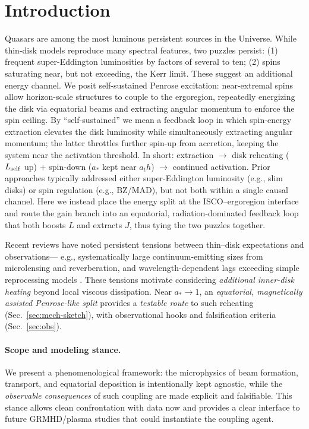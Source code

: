 \documentclass[twocolumn]{aastex701}
\newcommand{\ath}{a_{\rm th}}
\newcommand{\rg}{r_g}
\newcommand{\LEdd}{L_{\rm Edd}}
\newcommand{\Ltot}{L_{\rm tot}}
\newcommand{\FeKa}{\mathrm{Fe\,K}\alpha}
\def\ath{a_th}\def\rg{r_g}\def\LEdd{L_Edd}\def\Ltot{L_tot}\def\FeKa{Fe K\string\alpha}%
\begin{document}
\section{Introduction}\label{sec:intro}
Quasars are among the most luminous persistent sources in the Universe. While thin-disk models reproduce many spectral features, two puzzles persist: (1) frequent super-Eddington luminosities by factors of several to ten; (2) spins saturating near, but not exceeding, the Kerr limit. These suggest an additional energy channel. We posit self-sustained Penrose excitation: near-extremal spins allow horizon-scale structures to couple to the ergoregion, repeatedly energizing the disk via equatorial beams and extracting angular momentum to enforce the spin ceiling.
By ``self-sustained'' we mean a feedback loop in which spin-energy extraction elevates the disk luminosity while simultaneously extracting angular momentum; the latter throttles further spin-up from accretion, keeping the system near the activation threshold. In short: extraction $\rightarrow$ disk reheating ($L_{\rm self}$ up) $+$ spin-down ($a_\ast$ kept near $\ath$) $\rightarrow$ continued activation.
Prior approaches typically addressed either super-Eddington luminosity (e.g., slim disks) or spin regulation (e.g., BZ/MAD), but not both within a single causal channel. Here we instead place the energy split at the ISCO–ergoregion interface and route the gain branch into an equatorial, radiation-dominated feedback loop that both boosts $L$ and extracts $J$, thus tying the two puzzles together.

Recent reviews have noted persistent tensions between thin–disk expectations and observations—
e.g., systematically large continuum-emitting sizes from microlensing and reverberation, and
wavelength-dependent lags exceeding simple reprocessing models \citep[e.g.,][]{Cackett2021RevMap,Sun2020AGNsize}.
These tensions motivate considering \emph{additional inner-disk heating} beyond local viscous dissipation.
Near $a_*\!\to\!1$, an \emph{equatorial, magnetically assisted Penrose-like split} provides a \emph{testable route}
to such reheating (Sec.~\ref{sec:mech-sketch}), with observational hooks and falsification criteria
(Sec.~\ref{sec:obs}).


\paragraph{Scope and modeling stance.}
We present a phenomenological framework: the microphysics of beam formation, transport, and equatorial deposition is intentionally kept agnostic, while the \emph{observable consequences} of such coupling are made explicit and falsifiable. This stance allows clean confrontation with data now and provides a clear interface to future GRMHD/plasma studies that could instantiate the coupling agent.
\end{document}
